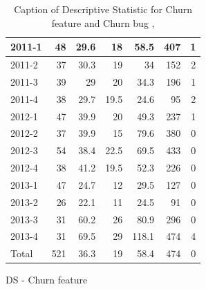 \documentclass[UKenglish]{ifimaster}  %
\begin{document}
\begin{appendices}
\begin{table}[!htbp]
\begin{adjustwidth}{-1.5cm}{}
\begin{subfigure}[b]{0.3\textwidth}
{\begin{tabular}{ | l | r | r | r | r | r | r | }
 2011-1  & 48 & 29.6 & 18 & 58.5 & 407 & 1 \\ \hline
 2011-2  & 37 & 30.3 & 19 & 34 & 152 & 2 \\ \hline
 2011-3  & 39 & 29 & 20 & 34.3 & 196 & 1 \\ \hline
 2011-4  & 38 & 29.7 & 19.5 & 24.6 & 95 & 2 \\ \hline
 2012-1  & 47 & 39.9 & 20 & 49.3 & 237 & 1 \\ \hline
 2012-2  & 37 & 39.9 & 15 & 79.6 & 380 & 0\\ \hline
 2012-3  & 54 & 38.4 & 22.5 & 69.5 & 433 & 0\\ \hline
 2012-4  & 38 & 41.2 & 19.5 & 52.3 & 226 & 0\\ \hline
 2013-1  & 47 & 24.7 & 12 & 29.5 & 127 & 0\\ \hline
 2013-2  & 26 & 22.1 & 11 & 24.5 & 91 & 0\\ \hline
 2013-3  & 31 & 60.2 & 26 & 80.9 & 296 & 0\\ \hline
 2013-4  & 31 & 69.5 & 29 & 118.1 & 474 & 4 \\ \hline
 Total  & 521 & 36.3 & 19 & 58.4 & 474 & 0\\ \hline
\end{tabular}
}
\caption{DS - Churn feature}
 \label{DS:CB:2}
\end{subfigure}
\end{adjustwidth}
\caption[Optional caption for list of figures]{Caption of Descriptive Statistic for Churn feature and Churn bug , }
\label{DS:2:4}
\end{table}






\end{appendices}
\end{document}

